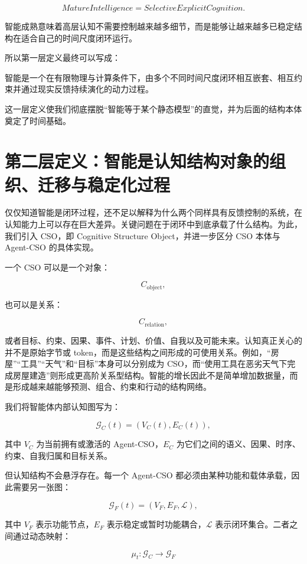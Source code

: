 \[
\boxed{
MatureIntelligence
=
SelectiveExplicitCognition.
}
\]

智能成熟意味着高层认知不需要控制越来越多细节，而是能够让越来越多已稳定结构在适合自己的时间尺度闭环运行。

所以第一层定义最终可以写成：

\begin{definition*}
智能是一个在有限物理与计算条件下，由多个不同时间尺度闭环相互嵌套、相互约束并通过现实反馈持续演化的动力过程。
\end{definition*}

这一层定义使我们彻底摆脱“智能等于某个静态模型”的直觉，并为后面的结构本体奠定了时间基础。

\section{第二层定义：智能是认知结构对象的组织、迁移与稳定化过程}

仅仅知道智能是闭环过程，还不足以解释为什么两个同样具有反馈控制的系统，在认知能力上可以存在巨大差异。关键问题在于闭环中到底承载了什么结构。为此，我们引入 CSO，即 Cognitive Structure Object，并进一步区分 CSO 本体与 Agent-CSO 的具体实现。

一个 CSO 可以是一个对象：

\[
C_{\mathrm{object}},
\]

也可以是关系：

\[
C_{\mathrm{relation}},
\]

或者目标、约束、因果、事件、计划、价值、自我以及可能未来。认知真正关心的并不是原始字节或 token，而是这些结构之间形成的可使用关系。例如，“房屋”“工具”“天气”和“目标”本身可以分别成为 CSO，而“使用工具在恶劣天气下完成房屋建造”则形成更高阶关系型结构。智能的增长因此不是简单增加数据量，而是形成越来越能够预测、组合、约束和行动的结构网络。

我们将智能体内部认知图写为：

\[
\mathcal G_C(t)
=
\left(
V_C(t),E_C(t)
\right),
\]

其中 \(V_C\) 为当前拥有或激活的 Agent-CSO，\(E_C\) 为它们之间的语义、因果、时序、约束、自我归属和目标关系。

但认知结构不会悬浮存在。每一个 Agent-CSO 都必须由某种功能和载体承载，因此需要另一张图：

\[
\mathcal G_F(t)
=
\left(
V_F,E_F,\mathcal L
\right),
\]

其中 \(V_F\) 表示功能节点，\(E_F\) 表示稳定或暂时功能耦合，\(\mathcal L\) 表示闭环集合。二者之间通过动态映射：

\[
\mu_t:
\mathcal G_C
\rightarrow
\mathcal G_F
\]

